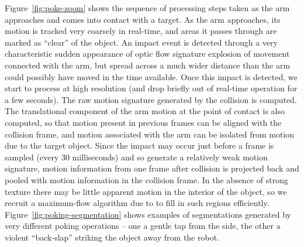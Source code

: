 



Figure~\ref{fig:poke-zoom} shows the sequence of processing steps
taken as the arm approaches and comes into contact with a target.  As
the arm approaches, its motion is tracked very coarsely in real-time,
and areas it passes through are marked as ``clear'' of the object.  An impact event
is detected through a 
\ifverbose
very characteristic sudden appearance of optic flow 
\else
signature explosion of movement 
\fi
connected with
the arm, but spread across a much wider distance than the arm could
possibly have moved in the time available.  Once this impact is detected, we
start to process at high resolution (and drop briefly out of real-time
operation for a few seconds).  The raw motion signature generated by
the collision is computed.  The translational component of the arm
motion at the point of contact is also computed, so that motion present in
previous frames can be aligned with the collision frame, and motion 
associated with the arm can be isolated from motion
due to the target object.  Since the impact may occur just before a
frame is sampled (every 30 milliseconds) and so generate a relatively
weak motion signature, motion information from one frame after
collision is projected back and pooled with motion information in the
collision frame.  In the absence of strong texture there may be little apparent motion
 in the interior of the object, so we recruit a maximum-flow
algorithm due to \cite{boykov01experimental} to fill in such regions
efficiently.
%
Figure~\ref{fig:poking-segmentation} shows examples of segmentations
generated by very different poking operations -- one a gentle
tap from the side, the other a violent ``back-slap'' striking
the object away from the robot.

